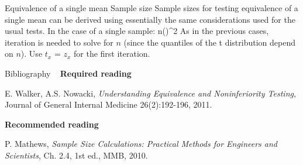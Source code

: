 \documentclass[t]{beamer}
\begin{document}



\begin{ftst}
{Equivalence of a single mean}
{Sample size}
Sample sizes for testing equivalence of a single mean can be derived using essentially the same considerations used for the usual tests. In the case of a single sample:
\beqs
n\geq\left(\right)^2
\eqs
\vone
As in the previous cases, iteration is needed to solve for $n$ (since the quantiles of the t distribution depend on $n$). Use $t_x$ = $z_x$ for the first iteration.
\end{ftst}







\begin{ftst}
{Bibliography}
{\ }
\scriptsize
\textbf{Required reading}

\benums  E. Walker, A.S. Nowacki, \textit{Understanding Equivalence and Noninferiority Testing}, Journal of General Internal Medicine 26(2):192-196, 2011.
\eenum

\textbf{Recommended reading}

\benums P. Mathews, \textit{Sample Size Calculations: Practical Methods for Engineers and Scientists}, Ch. 2.4, 1st ed., MMB, 2010.
\eenum
\end{ftst}
\end{document}
